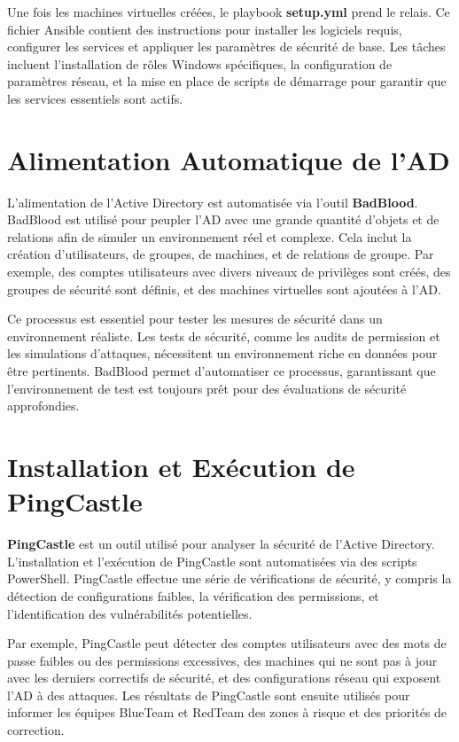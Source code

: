 \documentclass{article}
\begin{document}
Une fois les machines virtuelles créées, le playbook \textbf{setup.yml} prend le relais. Ce fichier Ansible contient des instructions pour installer les logiciels requis, configurer les services et appliquer les paramètres de sécurité de base. Les tâches incluent l'installation de rôles Windows spécifiques, la configuration de paramètres réseau, et la mise en place de scripts de démarrage pour garantir que les services essentiels sont actifs.

\section{Alimentation Automatique de l'AD}
L'alimentation de l'Active Directory est automatisée via l'outil \textbf{BadBlood}. BadBlood est utilisé pour peupler l'AD avec une grande quantité d'objets et de relations afin de simuler un environnement réel et complexe. Cela inclut la création d'utilisateurs, de groupes, de machines, et de relations de groupe. Par exemple, des comptes utilisateurs avec divers niveaux de privilèges sont créés, des groupes de sécurité sont définis, et des machines virtuelles sont ajoutées à l'AD.

Ce processus est essentiel pour tester les mesures de sécurité dans un environnement réaliste. Les tests de sécurité, comme les audits de permission et les simulations d'attaques, nécessitent un environnement riche en données pour être pertinents. BadBlood permet d'automatiser ce processus, garantissant que l'environnement de test est toujours prêt pour des évaluations de sécurité approfondies.

\section{Installation et Exécution de PingCastle}
\textbf{PingCastle} est un outil utilisé pour analyser la sécurité de l'Active Directory. L'installation et l'exécution de PingCastle sont automatisées via des scripts PowerShell. PingCastle effectue une série de vérifications de sécurité, y compris la détection de configurations faibles, la vérification des permissions, et l'identification des vulnérabilités potentielles.

Par exemple, PingCastle peut détecter des comptes utilisateurs avec des mots de passe faibles ou des permissions excessives, des machines qui ne sont pas à jour avec les derniers correctifs de sécurité, et des configurations réseau qui exposent l'AD à des attaques. Les résultats de PingCastle sont ensuite utilisés pour informer les équipes BlueTeam et RedTeam des zones à risque et des priorités de correction.
\end{document}
